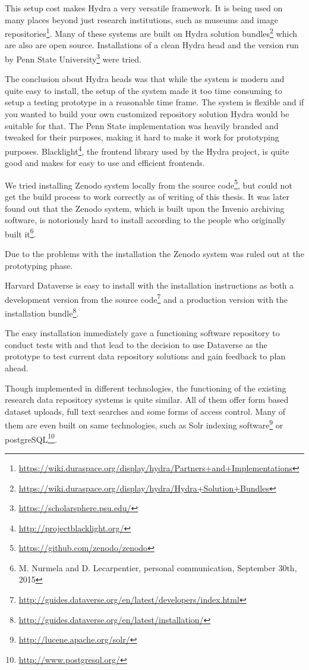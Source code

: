 This setup cost makes Hydra a very versatile framework. It is being used on many
places beyond just research institutions, such as museums and image
repositories\footnote{\url{https://wiki.duraspace.org/display/hydra/Partners+and+Implementations}}.
Many of these systems are built on Hydra solution
bundles\footnote{\url{https://wiki.duraspace.org/display/hydra/Hydra+Solution+Bundles}}
which are also
are open source. Installations of a clean Hydra head and the version
run by Penn State University\footnote{\url{https://scholarsphere.psu.edu/}} were tried.

The conclusion about Hydra heads was that while the system is modern and quite
easy to install, the setup of the system made it too time consuming to setup a
testing prototype in a reasonable time frame. The system is flexible and if you
wanted to build your own customized repository solution Hydra would be suitable
for that. The Penn State implementation was heavily branded and tweaked for
their purposes, making it hard to make it work for prototyping purposes.
Blacklight\footnote{\url{http://projectblacklight.org/}},
the frontend library used by the Hydra
project, is quite good and makes for easy to use and efficient frontends.

We tried installing Zenodo system locally from the source
code\footnote{\url{https://github.com/zenodo/zenodo}}, but could not get the
build process to work correctly as of writing of this thesis.
It was later found out that the Zenodo system, which is built upon the Invenio
archiving software, is notoriously hard to install according to the people who
originally built it\footnote{M. Nurmela and D. Lecarpentier, personal
communication, September 30th, 2015}.

Due to the problems with the installation the Zenodo system was ruled out at
the prototyping phase.

Harvard Dataverse is easy to install with the installation instructions as
both a development version from the source
code\footnote{\url{http://guides.dataverse.org/en/latest/developers/index.html}} and a
production version with
the installation bundle\footnote{\url{http://guides.dataverse.org/en/latest/installation/}}.

The easy installation immediately gave a functioning software repository to
conduct tests with and that lead to the decision to use Dataverse as the
prototype to test current data repository solutions and gain feedback to plan
ahead.

Though implemented in different technologies, the functioning of the existing
research data repository systems is quite similar. All of them offer form based
dataset uploads, full text searches and some forms of access control. Many of
them are even built on same technologies, such as Solr indexing
software\footnote{\label{solr}\url{http://lucene.apache.org/solr/}} or
postgreSQL\footnote{\label{postgre}\url{http://www.postgresql.org/}}.

